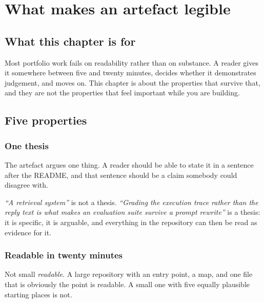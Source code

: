 \chapter{What makes an artefact legible}
\label{ch:legible}

\section*{What this chapter is for}

Most portfolio work fails on readability rather than on substance. A reader
gives it somewhere between five and twenty minutes, decides whether it
demonstrates judgement, and moves on. This chapter is about the properties that
survive that, and they are not the properties that feel important while you are
building.

\section{Five properties}

\subsection*{One thesis}

The artefact argues one thing. A reader should be able to state it in a
sentence after the README, and that sentence should be a claim somebody could
disagree with.

\emph{``A retrieval system''} is not a thesis. \emph{``Grading the execution
trace rather than the reply text is what makes an evaluation suite survive a
prompt rewrite''} is a thesis: it is specific, it is arguable, and everything
in the repository can then be read as evidence for it.


\subsection*{Readable in twenty minutes}

Not small \dash{} \emph{readable}. A large repository with an entry point, a
map, and one file that is obviously the point is readable. A small one with
five equally plausible starting places is not.


